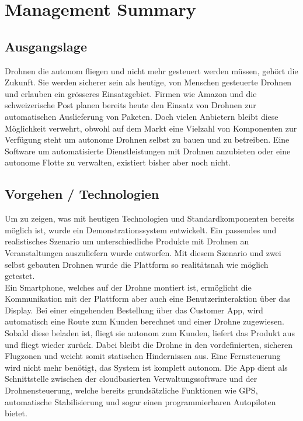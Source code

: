 \newpage
{}
\chapter*{Management Summary}
\section*{Ausgangslage}
Drohnen die autonom fliegen und nicht mehr gesteuert werden müssen, gehört die Zukunft. Sie werden sicherer sein als heutige, von Menschen gesteuerte Drohnen und erlauben ein grösseres Einsatzgebiet. Firmen wie Amazon und die schweizerische Post planen bereits heute den Einsatz von Drohnen zur automatischen Auslieferung von Paketen. Doch vielen Anbietern bleibt diese Möglichkeit verwehrt, obwohl auf dem Markt eine Vielzahl von Komponenten zur Verfügung steht um autonome Drohnen selbst zu bauen und zu betreiben. Eine Software um automatisierte Dienstleistungen mit Drohnen anzubieten oder eine autonome Flotte zu verwalten, existiert bisher aber noch nicht.

\section*{Vorgehen / Technologien}
Um zu zeigen, was mit heutigen Technologien und Standardkomponenten bereits möglich ist, wurde ein Demonstrationssystem entwickelt. Ein passendes und realistisches Szenario um unterschiedliche Produkte mit Drohnen an Veranstaltungen auszuliefern wurde entworfen. Mit diesem Szenario und zwei selbst gebauten Drohnen wurde die Plattform so realitätsnah wie möglich getestet.  \\

Ein Smartphone, welches auf der Drohne montiert ist, ermöglicht die Kommunikation mit der Plattform aber auch eine Benutzerinteraktion über das Display. Bei einer eingehenden Bestellung über das Customer App, wird automatisch eine Route zum Kunden berechnet und einer Drohne zugewiesen. Sobald diese beladen ist, fliegt sie autonom zum Kunden, liefert das Produkt aus und fliegt wieder zurück. Dabei bleibt die Drohne in den vordefinierten, sicheren Flugzonen und weicht somit statischen Hindernissen aus. Eine Fernsteuerung wird nicht mehr benötigt, das System ist komplett autonom. Die App dient als Schnittstelle zwischen der cloudbasierten Verwaltungssoftware und der Drohnensteuerung, welche bereits grundsätzliche Funktionen wie GPS, automatische Stabilisierung und sogar einen programmierbaren Autopiloten bietet.

